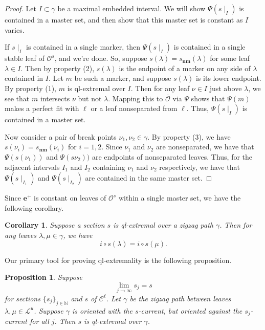 \documentclass[11pt]{amsart}
\renewcommand{\l}{\lambda}
\newcommand{\mc}{\mathcal}
\newcommand{\N}{\mathbb{N}}
\newcommand{\orb}{\mathcal{O}}
\newcommand{\eplus}{\mathbf{e}^+}
\newcommand{\snm}{s_\mathbf{nm}}
\numberwithin{equation}{section}
\newtheorem{proposition}[equation]{Proposition}
\newtheorem{corollary}[equation]{Corollary}
\theoremstyle{definition}
\begin{document}
\begin{proof}
	Let $I\subset\gamma$ be a maximal embedded interval. We will show $\Psi(s\mid_I)$ is contained in a master set, and then show that this master set is constant as $I$ varies.
	
	If $s\mid_I$ is contained in a single marker, then $\Psi(s\mid_I)$ is contained in a single stable leaf of $\orb^s$, and we're done. So, suppose $s(\l)=\snm(\l)$ for some leaf $\l\in I$. Then by property (2), $s(\l)$ is the endpoint of a marker on any side of $\l$ contained in $I$. Let $m$ be such a marker, and suppose $s(\l)$ is its lower endpoint. By property (1), $m$ is ql-extremal over $I$. Then for any leaf $\nu\in I$ just above $\l$, we see that $m$ intersects $\nu$ but not $\l$. Mapping this to $\overline{\orb}$ via $\Psi$ shows that $\Psi(m)$ makes a perfect fit with $\ell$ or a leaf nonseparated from $\ell$. Thus, $\Psi(s\mid_I)$ is contained in a master set.
	
	Now consider a pair of break points $\nu_1,\nu_2\in\gamma$. By property (3), we have $s(\nu_i)=\snm(\nu_i)$ for $i=1,2$. Since $\nu_1$ and $\nu_2$ are nonseparated, we have that $\Psi(s(\nu_1))$ and $\Psi(s\nu_2))$ are endpoints of nonseparated leaves. Thus, for the adjacent intervals $I_1$ and $I_2$ containing $\nu_1$ and $\nu_2$ respectively, we have that $\Psi(s\mid_{I_1})$ and $\Psi(s\mid_{I_2})$ are contained in the same master set.
\end{proof}

Since $\eplus$ is constant on leaves of $\orb^s$ within a single master set, we have the following corollary.

\begin{corollary}\label{cor:ql_i}
	Suppose a section $s$ is ql-extremal over a zigzag path $\gamma$. Then for any leaves $\l,\mu\in\gamma$, we have
	\[
	i\circ s(\l)=i\circ s(\mu).
	\]
\end{corollary}

Our primary tool for proving ql-extremality is the following proposition.

\begin{proposition}\label{prop:ql_lim}
	Suppose 
	\[
	\lim_{j\to\infty}s_j=s
	\]
	for sections $\{s_j\}_{j\in\N}$ and $s$ of $\mc C^\ell$. Let $\gamma$ be the zigzag path between leaves $\l,\mu\in\mc L^u$. Suppose $\gamma$ is oriented with the $s$-current, but oriented against the $s_j$-current for all $j$. Then $s$ is ql-extremal over $\gamma$.

\end{proposition}
\end{document}
